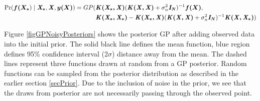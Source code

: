   \begin{equation}\label{eqNoisyPredictiveGP}
  \begin{aligned}
  \Pr(\boldsymbol{f(X_{*}}) \mid \bm{\mathit{X_{*}}}, \bm{\mathit{X}}, \boldsymbol{y(X)}) = GP(  & \bm{\mathit{K(X_{*}, X)}}( \bm{\mathit{K(X, X)}} + \sigma^{2}_{n}\bm{\mathit{I_N}} )^{-1}\boldsymbol{f(X)},   \\ 
                                & \bm{\mathit{K(X_{*}, X_{*})}} - \bm{\mathit{K(X_{*}, X)}}( \bm{\mathit{K(X, X)}} + \sigma^{2}_{n}\bm{\mathit{I_N}} )^{-1} \bm{\mathit{K(X, X_{*})}})
  \end{aligned}
  \end{equation}


Figure \ref{figGPNoisyPosteriors} shows the posterior GP after adding observed data into the initial prior. The solid black line defines the mean function, blue region defines 95\% confidence interval (2$\sigma$) distance away from the mean. The dashed lines represent three functions drawn at random from a GP posterior. Random functions can be sampled from the posterior distribution as described in the earlier section \ref{secPrior}.  Due to the inclusion of noise in the prior, we see that the draws from posterior are not necessarily passing through the observed point.


